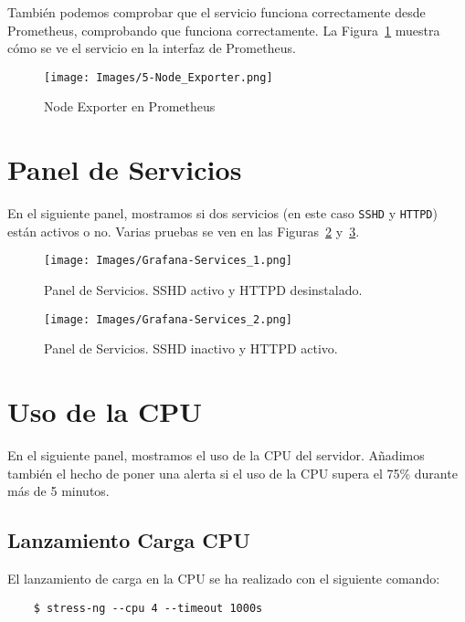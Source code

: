 \documentclass[a4paper,12pt]{article}
\begin{document}
\begin{enumerate}
    También podemos comprobar que el servicio funciona correctamente desde Prometheus, comprobando que funciona correctamente. La Figura~\ref{fig:5-Node_Exporter} muestra cómo se ve el servicio en la interfaz de Prometheus.
    \begin{figure}[h]
        \centering
        \texttt{[image: Images/5-Node\_Exporter.png]}
        \caption{Node Exporter en Prometheus}
        \label{fig:5-Node_Exporter}
    \end{figure}
\end{enumerate}

\section{Panel de Servicios}

En el siguiente panel, mostramos si dos servicios (en este caso \verb|SSHD| y \verb|HTTPD|) están activos o no. Varias pruebas se ven en las Figuras~\ref{fig:Grafana-Services_1} y~\ref{fig:Grafana-Services_2}.
\begin{figure}[h]
    \centering
    \texttt{[image: Images/Grafana-Services\_1.png]}
    \caption{Panel de Servicios. SSHD activo y HTTPD desinstalado.}
    \label{fig:Grafana-Services_1}
\end{figure}
\begin{figure}[h]
    \centering
    \texttt{[image: Images/Grafana-Services\_2.png]}
    \caption{Panel de Servicios. SSHD inactivo y HTTPD activo.}
    \label{fig:Grafana-Services_2}
\end{figure}

\section{Uso de la CPU}

En el siguiente panel, mostramos el uso de la CPU del servidor. Añadimos también el hecho de poner una alerta si el uso de la CPU supera el 75\% durante más de 5 minutos.

\subsection{Lanzamiento Carga CPU}

El lanzamiento de carga en la CPU se ha realizado con el siguiente comando:
\begin{verbatim}
    $ stress-ng --cpu 4 --timeout 1000s
\end{verbatim}
\end{document}
